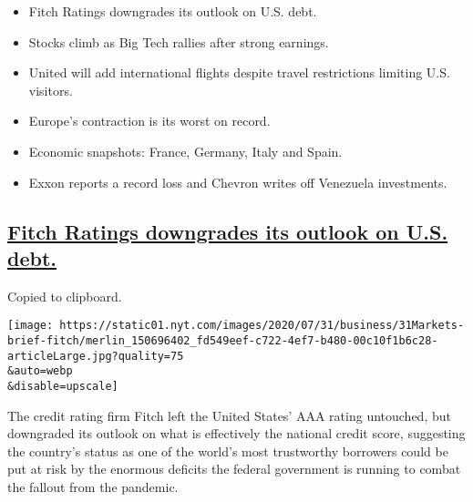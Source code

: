 \begin{itemize}
\item
  \protect\hyperlink{fitch-ratings-downgrades-its-outlook-on-us-debt}{}

  Fitch Ratings downgrades its outlook on U.S. debt.
\item
  \protect\hyperlink{stocks-climb-as-big-tech-rallies-after-strong-earnings}{}

  Stocks climb as Big Tech rallies after strong earnings.
\item
  \protect\hyperlink{united-will-add-international-flights-despite-travel-restrictions-limiting-us-visitors}{}

  United will add international flights despite travel restrictions
  limiting U.S. visitors.
\item
  \protect\hyperlink{europes-contraction-is-its-worst-on-record}{}

  Europe's contraction is its worst on record.
\item
  \protect\hyperlink{economic-snapshots-france-germany-italy-and-spain}{}

  Economic snapshots: France, Germany, Italy and Spain.
\item
  \protect\hyperlink{exxon-reports-a-record-loss-and-chevron-writes-off-venezuela-investments}{}

  Exxon reports a record loss and Chevron writes off Venezuela
  investments.
\end{itemize}

\hypertarget{fitch-ratings-downgrades-its-outlook-on-us-debt}{%
\subsection{\texorpdfstring{\protect\hyperlink{fitch-ratings-downgrades-its-outlook-on-us-debt}{Fitch
Ratings downgrades its outlook on U.S.
debt.}}{Fitch Ratings downgrades its outlook on U.S. debt.}}\label{fitch-ratings-downgrades-its-outlook-on-us-debt}}

Copied to clipboard.

\texttt{[image: https://static01.nyt.com/images/2020/07/31/business/31Markets-brief-fitch/merlin\_150696402\_fd549eef-c722-4ef7-b480-00c10f1b6c28-articleLarge.jpg?quality=75\\\&auto=webp\\\&disable=upscale]}

The credit rating firm Fitch left the United States' AAA rating
untouched, but downgraded its outlook on what is effectively the
national credit score, suggesting the country's status as one of the
world's most trustworthy borrowers could be put at risk by the enormous
deficits the federal government is running to combat the fallout from
the pandemic.

